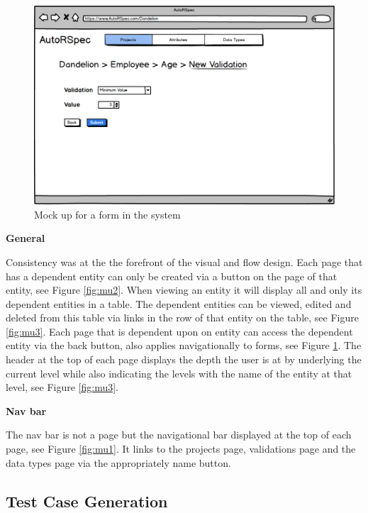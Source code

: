 \documentclass[a4paper,12pt]{article}
\begin{document}
\begin{figure}
\includegraphics[width=\linewidth]{screenshots/muform}
\caption{Mock up for a form in the system}
\label{fig:mu4}
\end{figure}
\vspace{3mm}
\par \textbf{General}
\par Consistency was at the the forefront of the visual and flow design. Each page that has a dependent entity can only be created via a button on the page of that entity, see Figure \ref{fig:mu2}. When viewing an entity it will display all and only its dependent entities in a table. The dependent entities can be viewed, edited and deleted from this table via links in the row of that entity on the table, see Figure \ref{fig:mu3}. Each page that is dependent upon on entity can access the dependent entity via the back button, also applies navigationally to forms, see Figure \ref{fig:mu4}. The header at the top of each page displays the depth the user is at by underlying the current level while also indicating the levels with the name of the entity at that level, see Figure \ref{fig:mu3}.
\vspace{3mm}
\par \textbf{Nav bar}
\par The nav bar is not a page but the navigational bar displayed at the top of each page, see Figure \ref{fig:mu1}. It links to the projects page, validations page and the data types page via the appropriately name button.

\subsection{Test Case Generation}
\end{document}
